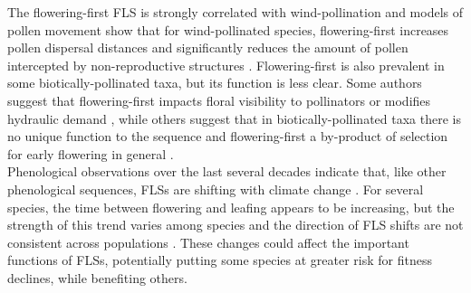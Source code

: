 \documentclass[12pt]{article}\usepackage[]{graphicx}\usepackage[]{color}
\begin{document}
\noindent The flowering-first FLS is strongly correlated with wind-pollination \citep{Buonaiuto2020, Friedman2009} and models of pollen movement show that for wind-pollinated species, flowering-first increases pollen dispersal distances and significantly reduces the amount of pollen intercepted by non-reproductive structures \citep{Di-Giovanni:1989aa,Tauber1967,Whitehead1969}. Flowering-first is also prevalent in some biotically-pollinated taxa, but its function is less clear. Some authors suggest that flowering-first impacts floral visibility to pollinators \citep{Janzen1967, Bukovac:2017aa,Forrest:2009aa} or modifies hydraulic demand \citep{Gougherty2018,Franklin2016}, while others suggest that in biotically-pollinated taxa there is no unique function to the sequence and flowering-first a by-product of selection for early flowering in general \citep{Primack1987}.\\ 

\noindent Phenological observations over the last several decades indicate that, like other phenological sequences, FLSs are shifting with climate change \citep{Ma2020:aa}. For several species, the time between flowering and leafing appears to be increasing, but the strength of this trend varies among species and the direction of FLS shifts are not consistent across populations \citep{Buonaiuto2020,Ma2020:aa}. These changes could affect the important functions of FLSs, potentially putting some species at greater risk for fitness declines, while benefiting others.\\


\end{document}
